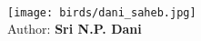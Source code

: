 \documentclass[11pt,openany]{book}
\begin{document}
\frontmatter





\newpage





\tableofcontents
\eject
~
\vfill

\thispagestyle{empty}

\begin{center}
\texttt{[image: birds/dani\_saheb.jpg]}\\[2pt]
{\large Author: \bf Sri N.P. Dani}
\end{center}
\vfill
\eject

\mainmatter


\end{document}
